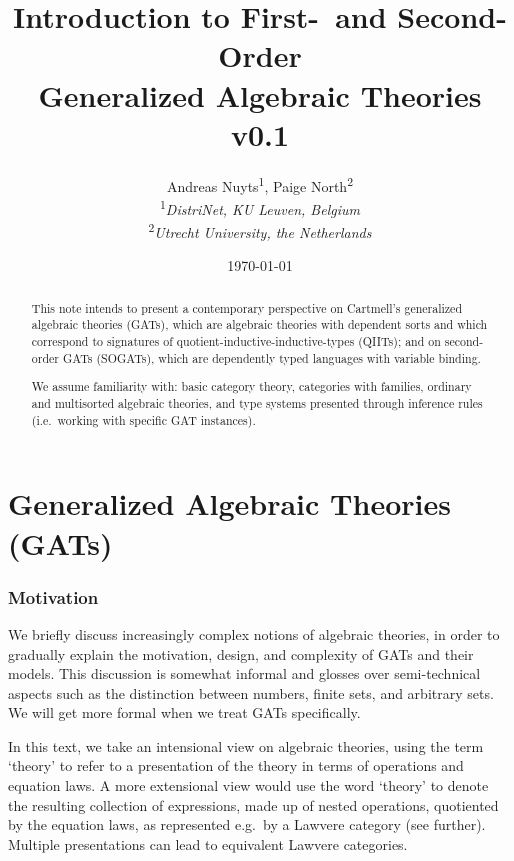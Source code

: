 \documentclass[a4paper]{article}
\newcommand{\thetitle}{Introduction to First-\ and Second-Order \\ Generalized Algebraic Theories}
\newcommand{\theversion}{0.1}
\newcommand{\theauthors}{Andreas Nuyts\textsuperscript{1}, Paige North\textsuperscript{2} \\ \textsuperscript{1}\emph{DistriNet, KU Leuven, Belgium} \\ \textsuperscript{2}\emph{Utrecht University, the Netherlands}}
\begin{document}
	\addtolength{\voffset}{-.5in}

\title{\thetitle \\ v\theversion}
\date{\today}
\author{\theauthors}
\maketitle

\begin{abstract}
	\noindent%
	This note intends to present a contemporary perspective on Cartmell's generalized algebraic theories (GATs), which are algebraic theories with dependent sorts and which correspond to signatures of quotient-inductive-inductive-types (QIITs); and on second-order GATs (SOGATs), which are dependently typed languages with variable binding.
	
	We assume familiarity with: basic category theory, categories with families, ordinary and multisorted algebraic theories, and type systems presented through inference rules (i.e.\ working with specific GAT instances).
\end{abstract}

\tableofcontents

\part{Generalized Algebraic Theories (GATs)}

\section{Motivation}
We briefly discuss increasingly complex notions of algebraic theories, in order to gradually explain the motivation, design, and complexity of GATs and their models.
This discussion is somewhat informal and glosses over semi-technical aspects such as the distinction between numbers, finite sets, and arbitrary sets.
We will get more formal when we treat GATs specifically.

\begin{remark} \label{rem:pres-as-theory}
In this text, we take an intensional view on algebraic theories, using the term `theory' to refer to a presentation of the theory in terms of operations and equation laws.
A more extensional view would use the word `theory' to denote the resulting collection of expressions, made up of nested operations, quotiented by the equation laws, as represented e.g.\ by a Lawvere category (see further).
Multiple presentations can lead to equivalent Lawvere categories.
\end{remark}
\end{document}
